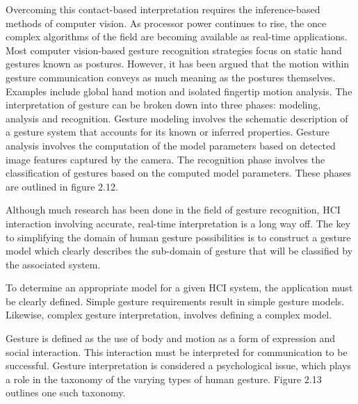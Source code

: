 Overcoming this contact-based interpretation requires the inference-based methods of computer vision. As processor power continues to rise, the once complex algorithms of the field are becoming available as real-time applications. Most computer vision-based gesture recognition strategies focus on static hand gestures known as postures. However, it has been argued that the motion within gesture communication conveys as much meaning as the postures themselves. Examples include global hand motion and isolated fingertip motion analysis. The interpretation of gesture can be broken down into three phases: modeling, analysis and recognition. Gesture modeling involves the schematic description of a gesture system that accounts for its known or inferred properties. Gesture analysis involves the computation of the model parameters based on detected image features captured by the camera. The recognition phase involves the classification of gestures based on the computed model parameters. These phases are outlined in figure 2.12.

Although much research has been done in the field of gesture recognition, HCI interaction involving accurate, real-time interpretation is a long way off. The key to simplifying the domain of human gesture possibilities is to construct a gesture model which clearly describes the sub-domain of gesture that will be classified by the associated system.



To determine an appropriate model for a given HCI system, the application must be clearly defined. Simple gesture requirements result in simple gesture models. Likewise, complex gesture interpretation, involves defining a complex model.

Gesture is defined as the use of body and motion as a form of expression and social interaction. This interaction must be interpreted for communication to be successful. Gesture interpretation is considered a psychological issue, which plays a role in the taxonomy of the varying types of human gesture. Figure 2.13 outlines one such taxonomy.

